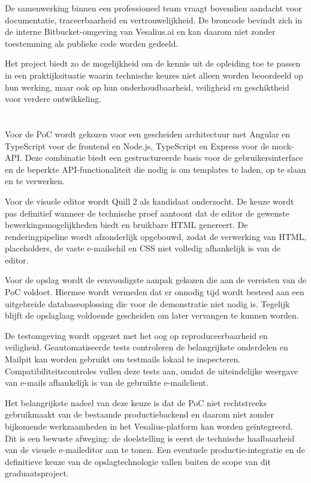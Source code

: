 De samenwerking binnen een professioneel team vraagt bovendien aandacht
voor documentatie, traceerbaarheid en vertrouwelijkheid. De broncode bevindt
zich in de interne Bitbucket-omgeving van Vesalius.ai en kan daarom niet
zonder toestemming als publieke code worden gedeeld.

Het project biedt zo de mogelijkheid om de kennis uit de opleiding toe
te passen in een praktijksituatie waarin technische keuzes niet alleen
worden beoordeeld op hun werking, maar ook op hun onderhoudbaarheid,
veiligheid en geschiktheid voor verdere ontwikkeling.

\section{}%
\label{sec:keuze}
Voor de PoC wordt gekozen voor een gescheiden architectuur met Angular en
TypeScript voor de frontend en Node.js, TypeScript en Express voor de
mock-API. Deze combinatie biedt een gestructureerde basis voor de
gebruikersinterface en de beperkte API-functionaliteit die nodig is om
templates te laden, op te slaan en te verwerken.

Voor de visuele editor wordt Quill 2 als kandidaat onderzocht. De keuze
wordt pas definitief wanneer de technische proef aantoont dat de editor
de gewenste bewerkingsmogelijkheden biedt en bruikbare HTML genereert.
De renderingpipeline wordt afzonderlijk opgebouwd, zodat de verwerking
van HTML, placeholders, de vaste e-mailschil en CSS niet volledig afhankelijk
is van de editor.

Voor de opslag wordt de eenvoudigste aanpak gekozen die aan de vereisten
van de PoC voldoet. Hiermee wordt vermeden dat er onnodig tijd wordt besteed
aan een uitgebreide databaseoplossing die voor de demonstratie niet nodig
is. Tegelijk blijft de opslaglaag voldoende gescheiden om later vervangen
te kunnen worden.

De testomgeving wordt opgezet met het oog op reproduceerbaarheid en
veiligheid. Geautomatiseerde tests controleren de belangrijkste onderdelen
en Mailpit kan worden gebruikt om testmails lokaal te inspecteren.
Compatibiliteitscontroles vullen deze tests aan, omdat de uiteindelijke
weergave van e-mails afhankelijk is van de gebruikte e-mailclient.

Het belangrijkste nadeel van deze keuze is dat de PoC niet rechtstreeks
gebruikmaakt van de bestaande productiebackend en daarom niet zonder
bijkomende werkzaamheden in het Vesalius-platform kan worden geïntegreerd.
Dit is een bewuste afweging: de doelstelling is eerst de technische
haalbaarheid van de visuele e-maileditor aan te tonen. Een eventuele
productie-integratie en de definitieve keuze van de opslagtechnologie
vallen buiten de scope van dit graduaatsproject.


